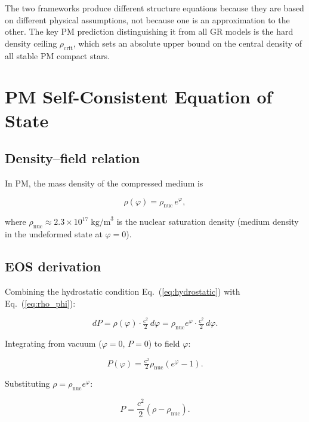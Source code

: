 \documentclass[11pt,a4paper]{article}
\newcommand{\rhonuc}{\rho_\text{nuc}}
\newcommand{\rhocrit}{\rho_\text{crit}}
\begin{document}
The two frameworks produce different structure equations because they are
based on different physical assumptions, not because one is an approximation
to the other.  The key PM prediction distinguishing it from all GR models is
the hard density ceiling $\rhocrit$, which sets an absolute upper bound on
the central density of all stable PM compact stars.

\section{PM Self-Consistent Equation of State}

\subsection{Density–field relation}

In PM, the mass density of the compressed medium is

\begin{equation}
  \rho(\varphi) = \rhonuc\,e^{\varphi},
  \label{eq:rho_phi}
\end{equation}

where $\rhonuc \approx 2.3\times10^{17}\;\text{kg/m}^3$ is the nuclear saturation
density (medium density in the undeformed state at $\varphi = 0$).

\subsection{EOS derivation}

Combining the hydrostatic condition Eq.~(\ref{eq:hydrostatic}) with
Eq.~(\ref{eq:rho_phi}):

\begin{equation}
  dP = \rho(\varphi)\cdot\tfrac{c^2}{2}\,d\varphi
     = \rhonuc e^{\varphi}\cdot\tfrac{c^2}{2}\,d\varphi.
\end{equation}

Integrating from vacuum ($\varphi = 0$, $P = 0$) to field $\varphi$:

\begin{equation}
  P(\varphi) = \tfrac{c^2}{2}\rhonuc(e^{\varphi} - 1).
\end{equation}

Substituting $\rho = \rhonuc e^{\varphi}$:

\begin{equation}
  \boxed{P = \frac{c^2}{2}(\rho - \rhonuc).}
  \label{eq:eos}
\end{equation}
\end{document}
